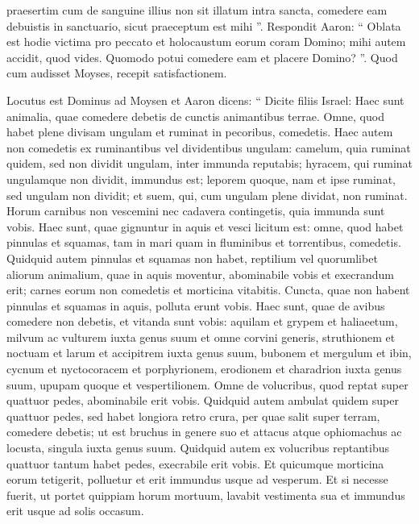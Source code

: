 \begin{biblechapter}
\begin{biblechapter}
\begin{biblechapter}
\begin{biblechapter}
\begin{biblechapter}
\begin{biblechapter}
\begin{biblechapter}
\begin{biblechapter}
\begin{biblechapter}
\begin{biblechapter}
\verse praesertim cum de sanguine illius non sit illatum intra sancta, comedere eam debuistis in sanctuario, sicut praeceptum est mihi ”. 
\verse Respondit Aaron: “ Oblata est hodie victima pro peccato et holocaustum eorum coram Domino; mihi autem accidit, quod vides. Quomodo potui comedere eam et placere Domino? ”. 
\verse Quod cum audisset Moyses, recepit satisfactionem.
 
\begin{biblechapter}
\verse Locutus est Dominus ad Moysen et Aaron dicens: 
\verse “ Dicite filiis Israel: Haec sunt animalia, quae comedere debetis de cunctis animantibus terrae. 
\verse Omne, quod habet plene divisam ungulam et ruminat in pecoribus, comedetis. 
 \verse Haec autem non comedetis ex ruminantibus vel dividentibus ungulam: camelum, quia ruminat quidem, sed non dividit ungulam, inter immunda reputabis; 
\verse hyracem, qui ruminat ungulamque non dividit, immundus est; 
\verse leporem quoque, nam et ipse ruminat, sed ungulam non dividit; 
\verse et suem, qui, cum ungulam plene dividat, non ruminat. 
\verse Horum carnibus non vescemini nec cadavera contingetis, quia immunda sunt vobis.
 \verse Haec sunt, quae gignuntur in aquis et vesci licitum est: omne, quod habet pinnulas et squamas, tam in mari quam in fluminibus et torrentibus, comedetis. 
\verse Quidquid autem pinnulas et squamas non habet, reptilium vel quorumlibet aliorum animalium, quae in aquis moventur, abominabile vobis 
\verse et execrandum erit; carnes eorum non comedetis et morticina vitabitis. 
\verse Cuncta, quae non habent pinnulas et squamas in aquis, polluta erunt vobis.
 \verse Haec sunt, quae de avibus comedere non debetis, et vitanda sunt vobis: aquilam et grypem et haliaeetum, 
\verse milvum ac vulturem iuxta genus suum 
 \verse et omne corvini generis, 
\verse struthionem et noctuam et larum et accipitrem iuxta genus suum, 
\verse bubonem et mergulum et ibin, 
\verse cycnum et nyctocoracem et porphyrionem, 
\verse erodionem et charadrion iuxta genus suum, upupam quoque et vespertilionem.
 \verse Omne de volucribus, quod reptat super quattuor pedes, abominabile erit vobis. 
\verse Quidquid autem ambulat quidem super quattuor pedes, sed habet longiora retro crura, per quae salit super terram, 
\verse comedere debetis; ut est bruchus in genere suo et attacus atque ophiomachus ac locusta, singula iuxta genus suum. 
\verse Quidquid autem ex volucribus reptantibus quattuor tantum habet pedes, execrabile erit vobis. 
\verse Et quicumque morticina eorum tetigerit, polluetur et erit immundus usque ad vesperum. 
\verse Et si necesse fuerit, ut portet quippiam horum mortuum, lavabit vestimenta sua et immundus erit usque ad solis occasum.

\end{biblechapter}
\end{biblechapter}
\end{biblechapter}
\end{biblechapter}
\end{biblechapter}
\end{biblechapter}
\end{biblechapter}
\end{biblechapter}
\end{biblechapter}
\end{biblechapter}
\end{biblechapter}
